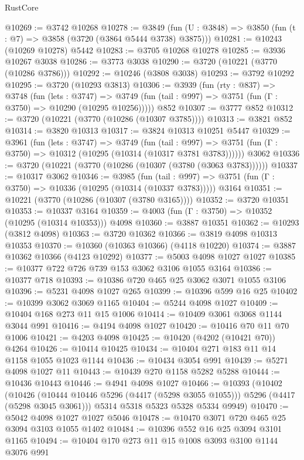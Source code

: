 \begin{lexlean}{RustCore}
\begin{coremodule}
@10269 := @3742 @10268
@10278 := @3849 (fun (U : @3848) => @3850 (fun (t : @7) => @3858 (@3720 (@3864 @5444 @3738) @3875)))
@10281 := @10243 (@10269 @10278) @5442
@10283 := @3705 @10268 @10278
@10285 := @3936 @10267 @3038
@10286 := @3773 @3038
@10290 := @3720 (@10221 (@3770 (@10286 @3786)))
@10292 := @10246 (@3808 @3038)
@10293 := @3792 @10292
@10295 := @3720 (@10293 @3813)
@10306 := @3939
    (fun (rty : @837) =>
    @3748
      (fun (lets : @3747) =>
      @3749 (fun (tail : @997) => @3751 (fun (Γ : @3750) => @10290 (@10295 @10256)))))
    @852
@10307 := @3777 @852
@10312 := @3720 (@10221 (@3770 (@10286 (@10307 @3785))))
@10313 := @3821 @852
@10314 := @3820 @10313
@10317 := @3824 @10313 @10251 @5447
@10329 := @3961
    (fun (lets : @3747) =>
    @3749
      (fun (tail : @997) =>
      @3751 (fun (Γ : @3750) => @10312 (@10295 (@10314 (@10317 @3781 @3783))))))
    @3062
@10336 := @3720 (@10221 (@3770 (@10286 (@10307 (@3780 (@3063 @3783))))))
@10337 := @10317 @3062
@10346 := @3985
    (fun (tail : @997) => @3751 (fun (Γ : @3750) => @10336 (@10295 (@10314 (@10337 @3783)))))
    @3164
@10351 := @10221 (@3770 (@10286 (@10307 (@3780 @3165))))
@10352 := @3720 @10351
@10353 := @10337 @3164
@10359 := @4003 (fun (Γ : @3750) => @10352 (@10295 (@10314 @10353))) @4098
@10360 := @3887 @10351
@10362 := @10293 (@3812 @4098)
@10363 := @3720 @10362
@10366 := @3819 @4098 @10313 @10353
@10370 := @10360 (@10363 @10366) (@4118 @10220)
@10374 := @3887 @10362 @10366 (@4123 @10292)
@10377 := @5003 @4098 @1027 @1027
@10385 := @10377 @722 @726 @739 @153 @3062 @3106 @1055 @3164
@10386 := @10377 @718
@10393 := @10386 @720 @465 @25 @3062 @3071 @1055 @3106
@10396 := @5231 @4098 @1027 @265
@10399 := @10396 @599 @16 @25
@10402 := @10399 @3062 @3069 @1165
@10404 := @5244 @4098 @1027
@10409 := @10404 @168 @273 @11 @15 @1006
@10414 := @10409 @3061 @3068 @1144 @3044 @991
@10416 := @4194 @4098 @1027
@10420 := @10416 @70 @11 @70 @1006
@10421 := @4203 @4098
@10425 := @10420 (@4202 (@10421 @70)) @4264
@10426 := @10414 @10425
@10434 := @10404 @271 @183 @11 @14 @1158 @1055 @1023 @1144
@10436 := @10434 @3054 @991
@10439 := @5271 @4098 @1027 @11
@10443 := @10439 @270 @1158 @5282 @5288
@10444 := @10436 @10443
@10446 := @4941 @4098 @1027
@10466 := @10393
    (@10402
      (@10426 (@10444 @10446 @5296 (@4417 (@5298 @3055 @1055))) @5296 (@4417 (@5298 @3045 @3061)))
      @5314
      @5318
      @5323
      @5328
      @5334
      @9949)
@10470 := @5042 @4098 @1027 @1027 @5046
@10478 := @10470 @3071 @720 @465 @25 @3094 @3103 @1055 @1402
@10484 := @10396 @552 @16 @25 @3094 @3101 @1165
@10494 := @10404 @170 @273 @11 @15 @1008 @3093 @3100 @1144 @3076 @991

\end{coremodule}
\end{lexlean}
